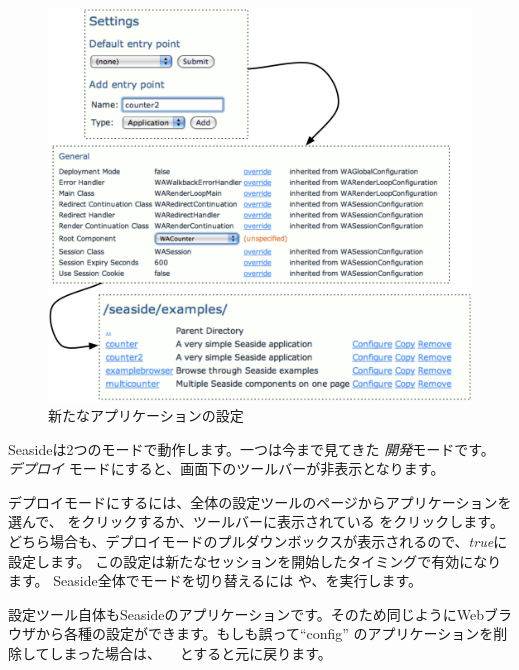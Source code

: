 \documentclass[a4paper,10pt,twoside]{book}
\begin{document}
\begin{figure}[ht]
\begin{center}
\includegraphics[width=\textwidth]{counter2}
\caption{新たなアプリケーションの設定}
\end{center}
\end{figure}

Seasideは2つのモードで動作します。一つは今まで見てきた \emph{開発}モードです。 \emph{デプロイ} モードにすると、画面下のツールバーが非表示となります。

デプロイモードにするには、全体の設定ツールのページからアプリケーションを選んで、  をクリックするか、ツールバーに表示されている  をクリックします。
どちら場合も、デプロイモードのプルダウンボックスが表示されるので、\emph{true}に設定します。
この設定は新たなセッションを開始したタイミングで有効になります。
Seaside全体でモードを切り替えるには や、を実行します。


設定ツール自体もSeasideのアプリケーションです。そのため同じようにWebブラウザから各種の設定ができます。もしも誤って``config'' のアプリケーションを削除してしまった場合は、
 　とすると元に戻ります。
\end{document}
